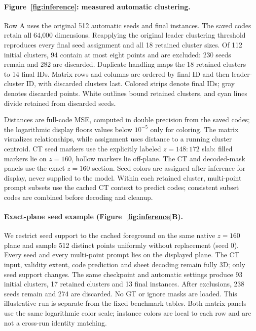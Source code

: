 \paragraph{Figure~\ref{fig:inference}: measured automatic clustering.}
Row A uses the original 512 automatic seeds and final instances. The
saved codes retain all 64,000 dimensions. Reapplying the original leader
clustering threshold reproduces every final seed assignment and all 18 retained
cluster sizes. Of 112 initial clusters, 94 contain at most eight points and
are excluded: 230 seeds remain and 282 are discarded. Duplicate handling maps
the 18 retained clusters to 14 final IDs. Matrix rows and columns are ordered
by final ID and then leader-cluster ID, with discarded clusters last. Colored
strips denote final IDs; gray denotes discarded points. White outlines bound
retained clusters, and cyan lines divide retained from discarded seeds.

Distances are full-code MSE, computed in double precision from the saved codes;
the logarithmic display floors values below $10^{-5}$ only for coloring. The
matrix visualizes relationships, while assignment uses distance to a running
cluster centroid. CT seed markers use the explicitly labeled $z=148{:}172$
slab: filled markers lie on $z=160$, hollow markers lie off-plane. The CT and
decoded-mask panels use the exact $z=160$ section. Seed colors are assigned
after inference for display, never supplied to the model. Within each retained
cluster, multi-point prompt subsets use the cached CT context to predict codes;
consistent subset codes are combined before decoding and cleanup.

\paragraph{Exact-plane seed example (Figure~\ref{fig:inference}B).}
We restrict seed support to the cached foreground on the same native $z=160$
plane and sample 512 distinct points uniformly without replacement (seed 0).
Every seed and every multi-point prompt lies on the displayed plane. The CT
input, validity extent, code prediction and sheet decoding remain fully 3D;
only seed support changes. The same checkpoint and automatic settings produce
93 initial clusters, 17 retained clusters and 13 final instances. After
exclusions, 238 seeds remain and 274 are discarded. No GT or ignore masks are
loaded. This illustrative run is separate from the fixed benchmark tables.
Both matrix panels use the same logarithmic color scale; instance colors are
local to each row and are not a cross-run identity matching.

